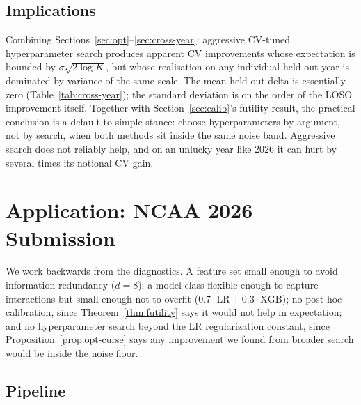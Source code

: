 \documentclass[11pt,a4paper]{article}
\theoremstyle{definition}
\begin{document}
\subsection{Implications}

Combining Sections~\ref{sec:opt}--\ref{sec:cross-year}: aggressive CV-tuned hyperparameter search produces apparent CV improvements whose expectation is bounded by $\sigma \sqrt{2 \log K}$, but whose realisation on any individual held-out year is dominated by variance of the same scale. The mean held-out delta is essentially zero (Table~\ref{tab:cross-year}); the standard deviation is on the order of the LOSO improvement itself. Together with Section~\ref{sec:calib}'s futility result, the practical conclusion is a default-to-simple stance: choose hyperparameters by argument, not by search, when both methods sit inside the same noise band. Aggressive search does not reliably help, and on an unlucky year like 2026 it can hurt by several times its notional CV gain.

\section{Application: NCAA 2026 Submission}\label{sec:application}

We work backwards from the diagnostics. A feature set small enough to avoid information redundancy ($d = 8$); a model class flexible enough to capture interactions but small enough not to overfit ($0.7 \cdot \mathrm{LR} + 0.3 \cdot \mathrm{XGB}$); no post-hoc calibration, since Theorem~\ref{thm:futility} says it would not help in expectation; and no hyperparameter search beyond the LR regularization constant, since Proposition~\ref{prop:opt-curse} says any improvement we found from broader search would be inside the noise floor.

\subsection{Pipeline}
\end{document}
